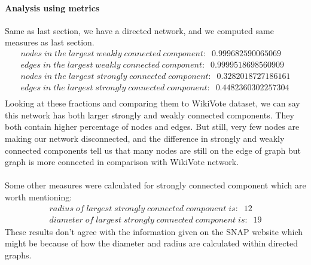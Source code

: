 \documentclass[letterpaper, 11pt]{article}
\newcommand{\1}{\mathds{1}}	%
\theoremstyle{definition}
\begin{document}
\paragraph{Analysis using metrics}Same as last section, we have a directed network, and we computed same measures as last section.
\begin{equation}
\begin{split} 
nodes\; in\; the\; largest\; weakly\; connected\; component:\;\; 0.999682590065069 \\
edges\; in\; the\; largest\; weakly\; connected\; component:\;\; 0.9999518698560909 \\
nodes\; in\; the\; largest\; strongly\; connected\; component:\;\; 0.3282018727186161 \\
edges\; in\; the\; largest\; strongly\; connected\; component:\;\; 0.4482360302257304 \\
\end{split}
\end{equation}
Looking at these fractions and comparing them to WikiVote dataset, we can say this network has both larger strongly and weakly connected components. They both contain higher percentage of nodes and edges. But still, very few nodes are making our network disconnected, and the difference in strongly and weakly connected components tell us that many nodes are still on the edge of graph but graph is more connected in comparison with WikiVote network.
\paragraph{}Some other measures were calculated for strongly connected component which are worth mentioning:
\begin{equation}
\begin{split} 
radius\; of\; largest\; strongly\; connected\; component\; is:\;\; 12 \\
diameter\; of\; largest\; strongly\; connected\; component\; is:\;\; 19
\end{split}
\end{equation}
These results don't agree with the information given on the SNAP website which might be because of how the diameter and radius are calculated within directed graphs.
\end{document}
